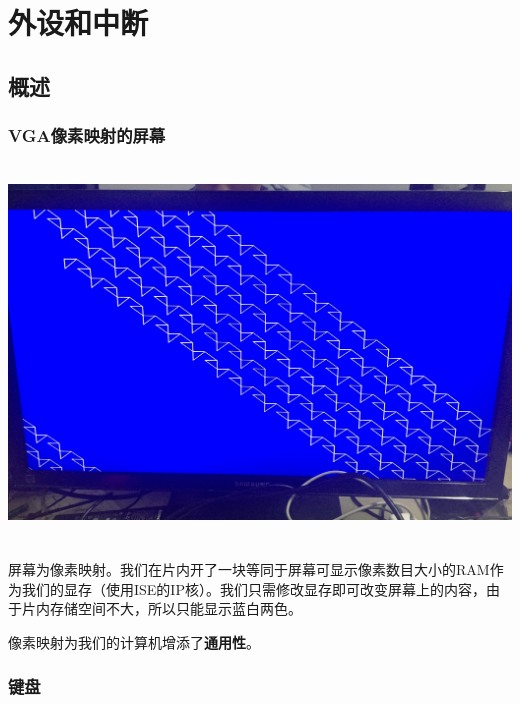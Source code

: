 \section{外设和中断}

\subsection{概述}

\subsubsection{VGA像素映射的屏幕}

\begin{center}
    \includegraphics[height=10cm]{image/extension/tri.JPG}
    \label{fig:ifid}
\end{center}

屏幕为像素映射。我们在片内开了一块等同于屏幕可显示像素数目大小的RAM作为我们的显存（使用ISE的IP核）。我们只需修改显存即可改变屏幕上的内容，由于片内存储空间不大，所以只能显示蓝白两色。

像素映射为我们的计算机增添了\textbf{通用性}。

\subsubsection{键盘}


